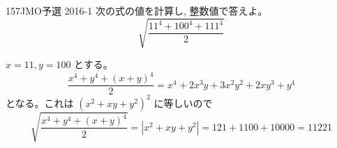 \begin{prob}{157}{}{JMO予選 2016-1}
 次の式の値を計算し, 整数値で答えよ。\\
 \[ \sqrt{\dfrac{11^4+100^4+111^4}{2}} \]
\end{prob}

$x=11, y=100$ とする。
\[\dfrac{x^4+y^4+(x+y)^4}{2}=x^4+2x^3y+3x^2y^2+2xy^3+y^4\]
となる。これは $(x^2+xy+y^2)^2$ に等しいので
\[\sqrt{\dfrac{x^4+y^4+(x+y)^4}{2}}=|x^2+xy+y^2|=121+1100+10000=11221\]
